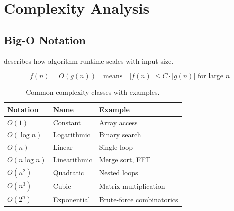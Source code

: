 
\newpage
\section{Complexity Analysis}

\subsection{Big-O Notation}

 describes how algorithm runtime scales with input size.

\begin{equation}
    f(n) = O(g(n)) \quad \text{means} \quad |f(n)| \leq C \cdot |g(n)| \text{ for large } n
\end{equation}



\begin{table}[ht]
\centering
\begin{tabular}{p{}p{}p{}}
\toprule
\textbf{Notation} & \textbf{Name} & \textbf{Example} \\
\midrule
$O(1)$ & Constant & Array access \\
$O(\log n)$ & Logarithmic & Binary search \\
$O(n)$ & Linear & Single loop \\
$O(n \log n)$ & Linearithmic & Merge sort, FFT \\
$O(n^2)$ & Quadratic & Nested loops \\
$O(n^3)$ & Cubic & Matrix multiplication \\
$O(2^n)$ & Exponential & Brute-force combinatorics \\
\bottomrule
\end{tabular}
\vspace{2em}
\caption{Common complexity classes with examples.}
\label{tab:complexity_classes}
\end{table}


